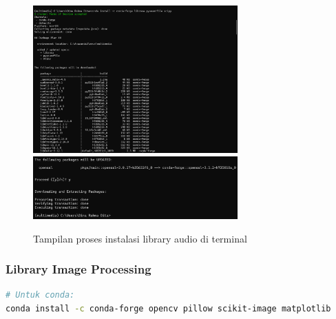 \documentclass[11pt,a4paper]{article}
\begin{document}
\begin{figure}[H]
    \centering
    \includegraphics[width=0.7\textwidth]{Figure/ss/3.png}
    \includegraphics[width=0.7\textwidth]{Figure/ss/4.png}
    \caption{Tampilan proses instalasi library audio di terminal}
    \label{fig:audio_library}
\end{figure}

\subsubsection{Library Image Processing}
\begin{lstlisting}[language=bash, caption=Instalasi library image]
# Untuk conda:
conda install -c conda-forge opencv pillow scikit-image matplotlib
\end{lstlisting}
\end{document}
